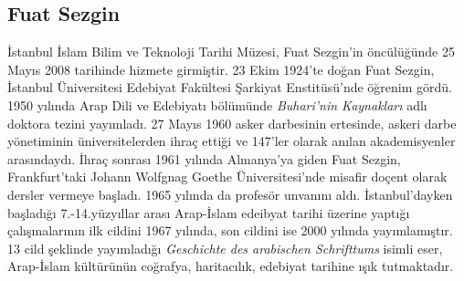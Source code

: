 \subsection{Fuat Sezgin}
\indent\indent İstanbul İslam Bilim ve Teknoloji Tarihi Müzesi, Fuat Sezgin'in öncülüğünde 25 Mayıs 2008 tarihinde hizmete girmiştir. 23 Ekim 1924'te doğan Fuat Sezgin, İstanbul Üniversitesi Edebiyat Fakültesi Şarkiyat Enstitüsü'nde öğrenim gördü. 1950 yılında Arap Dili ve Edebiyatı bölümünde \textit{Buhari'nin Kaynakları} adlı doktora tezini yayımladı. 27 Mayıs 1960 asker darbesinin ertesinde, askeri darbe yönetiminin üniversitelerden ihraç ettiği ve 147'ler olarak anılan akademisyenler arasındaydı. İhraç sonrası 1961 yılında Almanya'ya giden Fuat Sezgin, Frankfurt'taki Johann Wolfgnag Goethe Üniversitesi'nde misafir doçent olarak dersler vermeye başladı. 1965 yılında da profesör unvanını aldı.\newline
\indent İstanbul'dayken başladığı 7.-14.yüzyıllar arası Arap-İslam edeibyat tarihi üzerine yaptığı çalışmalarının ilk cildini 1967 yılında, son cildini ise 2000 yılında yayımlamıştır. 13 cild şeklinde yayımladığı \textit{Geschichte des arabischen Schrifttums} isimli eser, Arap-İslam kültürünün coğrafya, haritacılık, edebiyat tarihine ışık tutmaktadır.